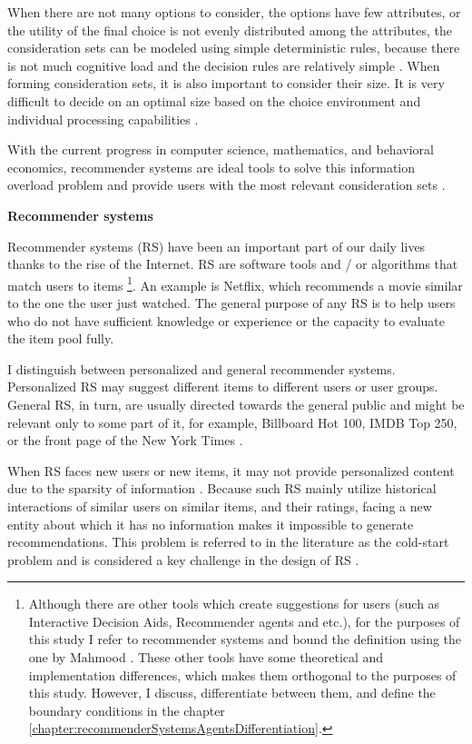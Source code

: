 \documentclass[a4paper,12pt]{article}
\newcommand{\citeyearonly}[1]{\citeyearpar{#1}}
\begin{document}
When there are not many options to consider, the options have few attributes, or the utility of the final choice is not evenly distributed among the attributes, the consideration sets can be modeled using simple deterministic rules, because there is not much cognitive load and the decision rules are relatively simple \citep{lee2004effect, hauser2014consideration}. When forming consideration sets, it is also important to consider their size. It is very difficult to decide on an optimal size based on the choice environment and individual processing capabilities \citep{de2011modelling}. 

With the current progress in computer science, mathematics, and behavioral economics, recommender systems are ideal tools to solve this information overload problem and provide users with the most relevant consideration sets \citep{breese2013empirical}.

    
\textbf{Recommender systems}    

Recommender systems (RS) have been an important part of our daily lives thanks to the rise of the Internet. RS are software tools and / or algorithms that match users to items \citep{mahmood2009improving} \footnote{Although there are other tools which create suggestions for users (such as Interactive Decision Aids, Recommender agents and etc.), for the purposes of this study I refer to recommender systems and bound the definition using the one by Mahmood \citeyearonly{mahmood2009improving}. These other tools have some theoretical and implementation differences, which makes them orthogonal to the purposes of this study. However, I discuss, differentiate between them, and define the boundary conditions in the chapter \ref{chapter:recommenderSystemsAgentsDifferentiation}.}. An example is Netflix, which recommends a movie similar to the one the user just watched. The general purpose of any RS is to help users who do not have sufficient knowledge or experience or the capacity to evaluate the item pool fully. 

I distinguish between personalized and general recommender systems. Personalized RS may suggest different items to different users or user groups. General RS, in turn, are usually directed towards the general public and might be relevant only to some part of it, for example, Billboard Hot 100, IMDB Top 250, or the front page of the New York Times \citep{ricci2010recsystems}.

When RS faces new users or new items, it may not provide personalized content due to the sparsity of information \citep{lika2014facing}. Because such RS mainly utilize historical interactions of similar users on similar items, and their ratings, facing a new entity about which it has no information makes it impossible to generate recommendations. This problem is referred to in the literature as the cold-start problem \citep{adomavicius2005toward} and is considered a key challenge in the design of RS \citep{park2009pairwise}.
\end{document}
